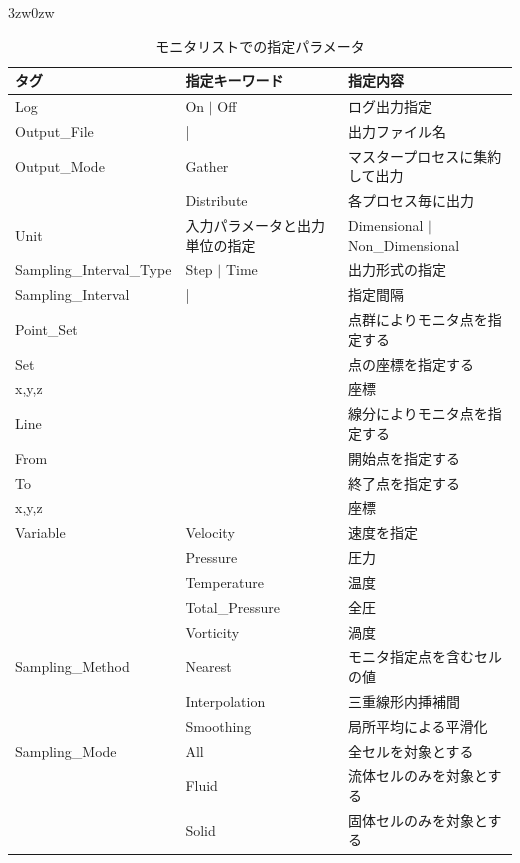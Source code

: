 \begin{indentation}{3zw}{0zw}
\begin{table}[htdp]
\caption{モニタリストでの指定パラメータ}
\begin{center}
\small
\begin{tabular}{lll} \toprule
タグ & 指定キーワード & 指定内容\\ \midrule
Log & On $|$ Off & ログ出力指定\\
Output\_File & | & 出力ファイル名\\
Output\_Mode & Gather & マスタープロセスに集約して出力\\
& Distribute & 各プロセス毎に出力\\
Unit & 入力パラメータと出力単位の指定 & Dimensional $|$ Non\_Dimensional\\
Sampling\_Interval\_Type & Step $|$ Time & 出力形式の指定\\
Sampling\_Interval & | & 指定間隔\\ \hline
Point\_Set & & 点群によりモニタ点を指定する\\
Set & & 点の座標を指定する\\
x,y,z & & 座標\\ \hline
Line & & 線分によりモニタ点を指定する\\
From & & 開始点を指定する\\
To & & 終了点を指定する\\
x,y,z & & 座標\\ \hline
Variable & Velocity & 速度を指定\\
 & Pressure & 圧力\\
 & Temperature & 温度\\
 & Total\_Pressure & 全圧\\
 & Vorticity & 渦度\\ \hline
Sampling\_Method & Nearest & モニタ指定点を含むセルの値\\
 & Interpolation & 三重線形内挿補間\\
 & Smoothing & 局所平均による平滑化\\ \hline
Sampling\_Mode & All & 全セルを対象とする\\
 & Fluid & 流体セルのみを対象とする\\
 & Solid & 固体セルのみを対象とする\\ \bottomrule
\end{tabular}
\end{center}
\label{tbl:monitor list}
\end{table}


\end{indentation}
